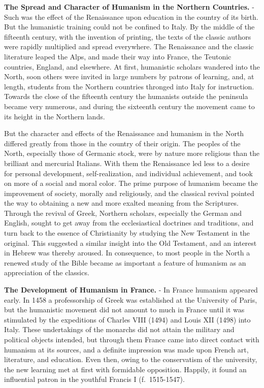 \documentclass[
]{book}
\begin{document}
\textbf{The Spread and Character of Humanism in the Northern Countries.} - Such was the effect of the Renaissance upon education in the country of its birth. But the humanistic training could not be confined to Italy. By the middle of the fifteenth century, with the invention of printing, the texts of the classic authors were rapidly multiplied and spread everywhere. The Renaissance and the classic literature leaped the Alps, and made their way into France, the Teutonic countries, England, and elsewhere. At first, humanistic scholars wandered into the North, soon others were invited in large numbers by patrons of learning, and, at length, students from the Northern countries thronged into Italy for instruction. Towards the close of the fifteenth century the humanists outside the peninsula became very numerous, and during the sixteenth century the movement came to its height in the Northern lands.

But the character and effects of the Renaissance and humanism in the North differed greatly from those in the country of their origin. The peoples of the North, especially those of Germanic stock, were by nature more religious than the brilliant and mercurial Italians. With them the Renaissance led less to a desire for personal development, self-realization, and individual achievement, and took on more of a social and moral color. The prime purpose of humanism became the improvement of society, morally and religiously, and the classical revival pointed the way to obtaining a new and more exalted meaning from the Scriptures. Through the revival of Greek, Northern scholars, especially the German and English, sought to get away from the ecclesiastical doctrines and traditions, and turn back to the essence of Christianity by studying the New Testament in the original. This suggested a similar insight into the Old Testament, and an interest in Hebrew was thereby aroused. In consequence, to most people in the North a renewed study of the Bible became as important a feature of humanism as an appreciation of the classics.

\textbf{The Development of Humanism in France.} - In France humanism appeared early. In 1458 a professorship of Greek was established at the University of Paris, but the humanistic movement did not amount to much in France until it was stimulated by the expeditions of Charles VIII (1494) and Louis XII (1498) into Italy. These undertakings of the monarchs did not attain the military and political objects intended, but through them France came into direct contact with humanism at its sources, and a definite impression was made upon French art, literature, and education. Even then, owing to the conservatism of the university, the new learning met at first with formidable opposition. Happily, it found an influential patron in the youthful Francis I (f.~1515-1547).
\end{document}
